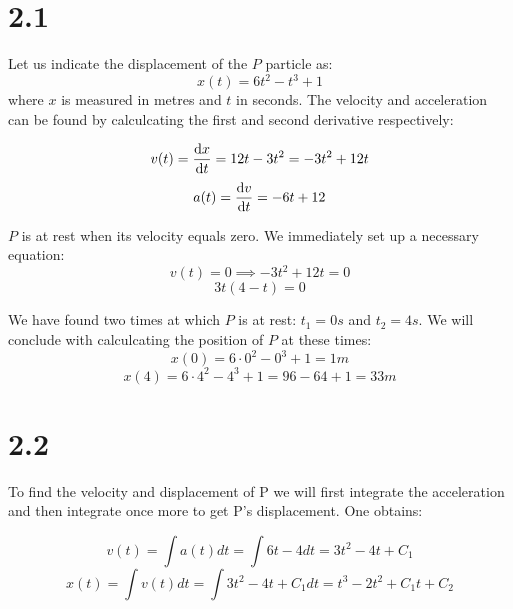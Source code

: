 \documentclass{article}
\begin{document}
\section*{2.1}

Let us indicate the displacement of the \(P\) particle as:
\begin{equation*}
    x(t) = 6t^{2} - t^{3} + 1
\end{equation*}
where \(x\) is measured in metres and \(t\) in seconds. The velocity and acceleration can be found
by calculcating the first and second derivative respectively:

\begin{equation*}
    v(t) = \dv{x}{t} = 12t - 3t^{2} = -3t^{2} + 12t
\end{equation*}
\begin{equation*}
    a(t) = \dv{v}{t} = -6t + 12
\end{equation*}


\(P\) is at rest when its velocity equals zero. We immediately set up a necessary equation:
\begin{equation*}
    v(t) = 0 \implies -3t^{2} + 12t = 0
\end{equation*}
\begin{equation*}
    3t(4 - t) = 0
\end{equation*}

We have found two times at which \(P\) is at rest: \(t_1 = 0s\) and \(t_2 = 4s\). We will conclude with
calculcating the position of \(P\) at these times:
\begin{equation*}
    x(0) = 6 \cdot 0^2 - 0^{3} + 1 = 1m
\end{equation*}
\begin{equation*}
    x(4) = 6 \cdot 4^{2} - 4^{3} + 1 = 96 - 64 + 1 = 33m
\end{equation*} 


\section*{2.2}

To find the velocity and displacement of P we will first integrate the acceleration and then
integrate once more to get P's displacement.
One obtains:

\begin{equation*}
    v(t) = \int a(t) dt = \int 6t - 4 dt = 3t^{2} -4t + C_1
\end{equation*}
\begin{equation*}
    x(t) = \int v(t) dt = \int 3t^{2} -4t + C_1 dt = t^{3} - 2t^{2} + C_{1}t + C_2
\end{equation*}
\end{document}
